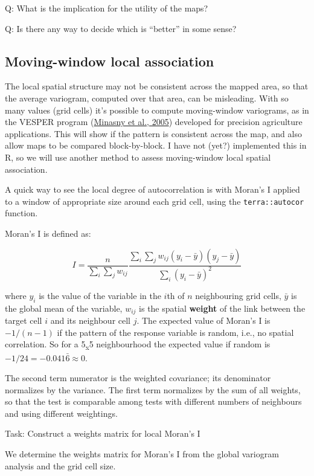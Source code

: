 \documentclass[
  letterpaper,
  DIV=11,
  numbers=noendperiod]{scrartcl}
\begin{document}
Q: What is the implication for the utility of the maps?

Q: Is there any way to decide which is ``better'' in some sense?

\hypertarget{moving-window-local-association}{%
\subsection{Moving-window local
association}\label{moving-window-local-association}}

The local spatial structure may not be consistent across the mapped
area, so that the average variogram, computed over that area, can be
misleading. With so many values (grid cells) it's possible to compute
moving-window variograms, as in the VESPER program
(\protect\hyperlink{ref-minasnyVESPERVariogramEstimation2005}{Minasny et
al., 2005}) developed for precision agriculture applications. This will
show if the pattern is consistent across the map, and also allow maps to
be compared block-by-block. I have not (yet?) implemented this in R, so
we will use another method to assess moving-window local spatial
association.

A quick way to see the local degree of autocorrelation is with Moran's I
applied to a window of appropriate size around each grid cell, using the
\texttt{terra::autocor} function.

Moran's I is defined as:

\[  I = \frac{n}{\sum_i \sum_j w_{ij}} \frac{\sum_i \sum_j w_{ij}(y_i - \bar{y})(y_j - \bar{y})}{\sum_i (y_i - \bar{y})^2}\]

where \(y_i\) is the value of the variable in the \(i\)th of \(n\)
neighbouring grid cells, \(\bar{y}\) is the global mean of the variable,
\(w_{ij}\) is the spatial \textbf{weight} of the link between the target
cell \(i\) and its neighbour cell \(j\). The expected value of Moran's I
is \(-1/(n-1)\) if the pattern of the response variable is random, i.e.,
no spatial correlation. So for a 5\textsubscript{x}5 neighbourhood the
expected value if random is \(-1/24 = -0.041\bar{6} \approx 0\).

The second term numerator is the weighted covariance; its denominator
normalizes by the variance. The first term normalizes by the sum of all
weights, so that the test is comparable among tests with different
numbers of neighbours and using different weightings.

Task: Construct a weights matrix for local Moran's I

We determine the weights matrix for Moran's I from the global variogram
analysis and the grid cell size.
\end{document}
